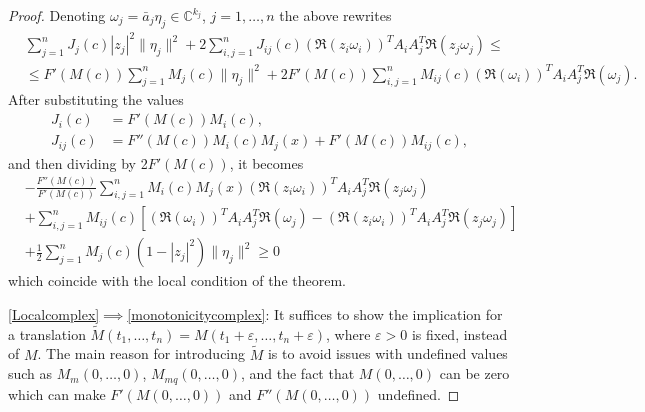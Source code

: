 \documentclass[9pt, a4paper]{amsart}
\newcommand{\C}{\mathbb{C}}
\newcommand{\1}{{\chi_{}}}%
\numberwithin{equation}{section}
\begin{document}
\begin{proof}
		Denoting $\omega_j = \bar{a}_j\eta_j \in\C^{k_j}$, $j=1,\ldots,n$ the above rewrites
		\begin{align*}
			& \sum_{j=1}^n J_j(c) |z_j|^2\|\eta_j\|^2+ 2 \sum_{ i,j=1}^{n} J_{ij}(c)(\Re(z_{i}\omega_i))^{T} A_{i}A_{j}^{T} \Re(z_{j}\omega_j)\leq\\
			&\leq F'(M(c))\sum_{j=1}^n M_j(c) \|\eta_j\|^2+ 2 F'(M(c))\sum_{ i,j=1}^{n} M_{ij}(c)(\Re(\omega_i))^{T} A_iA_j^T \Re(\omega_j).  
		\end{align*}
		After substituting the values 
		\begin{align*}
			J_i(c) &= F'(M(c)) M_i(c),\\
			J_{ij}(c) &= F''(M(c)) M_i(c)M_j(x) + F'(M(c)) M_{ij}(c),
		\end{align*}
		and then dividing by 2$F'(M(c))$, it becomes 
		\begin{align*}
			&-\frac{F''(M(c))}{F'(M(c))} \sum_{ i,j=1}^{n} M_i(c)M_j(x) (\Re(z_{i}\omega_i))^{T} A_{i}A_{j}^{T} \Re(z_{j}\omega_j)\\
			&+\sum_{ i,j=1}^{n} M_{ij}(c)\left[ (\Re(\omega_i))^{T} A_iA_j^T\Re(\omega_j)-  (\Re(z_{i}\omega_i))^{T} A_{i}A_{j}^{T} \Re(z_{j}\omega_j) \right] \\
			&+ \frac{1}{2}\sum_{j=1}^n M_j(c)(1-|z_j|^2) \|\eta_j\|^2  \geq0
		\end{align*}
		which coincide with the local condition of the theorem.
		
\eqref{Localcomplex}$\implies$\eqref{monotonicitycomplex}: It suffices to show the implication for a translation $\tilde{M}(t_1,\ldots,t_n) = M(t_1+\varepsilon,\ldots,t_n+\varepsilon)$, where $\varepsilon > 0$ is fixed, instead of $M$. The main reason for introducing $\tilde{M}$ is to avoid issues with undefined values such as $M_m(0,\ldots,0)$, $M_{mq}(0,\ldots,0)$, and the fact that $M(0,\ldots,0)$ can be zero  which can make $F'(M(0,\ldots,0))$ and $F''(M(0,\ldots,0))$ undefined. 
		

\end{proof}
\end{document}
